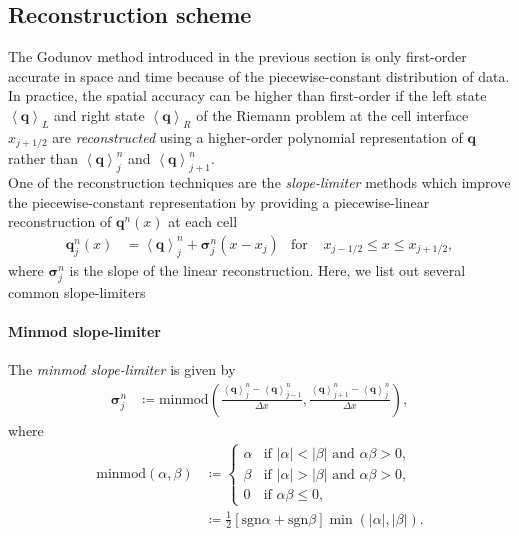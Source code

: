 \subsection{Reconstruction scheme}
The Godunov method introduced in the previous section is only first-order accurate in space and time
because of the piecewise-constant distribution of data.
In practice, the spatial accuracy can be higher than first-order 
if the left state $\left\langle \mathbf{q} \right\rangle_{L}$ 
and right state $\left\langle \mathbf{q} \right\rangle_{R}$ of the Riemann problem
at the cell interface $x_{j+1/2}$
are \textit{reconstructed} using a higher-order polynomial representation of $\mathbf{q}$
rather than $\left\langle \mathbf{q} \right\rangle^n_j$ and $\left\langle \mathbf{q} \right\rangle^n_{j+1}$.\\
One of the reconstruction techniques are the \textit{slope-limiter} methods 
which improve the piecewise-constant representation by providing a piecewise-linear reconstruction
of $\mathbf{q}^n(x)$ at each cell
\begin{align}
    \mathbf{q}^n_j (x) &= \left\langle \mathbf{q} \right\rangle^n_j + \mathbf{\sigma}^n_j \left(x-x_j \right) &
    \text{for } & x_{j-1/2} \leq x \leq x_{j+1/2},
\end{align}
where $\mathbf{\sigma}^n_j$ is the slope of the linear reconstruction.
Here, we list out several common slope-limiters
\paragraph{Minmod slope-limiter}
The \textit{minmod slope-limiter} \cite{ziegler2011semi,kolgan1972application,van1979towards}
is given by
\begin{align}
    \mathbf{\sigma}^n_j &\coloneqq \text{minmod}\left(
    \frac{\left\langle \mathbf{q} \right\rangle^n_j-\left\langle \mathbf{q} \right\rangle^n_{j-1}}{\Delta x},
    \frac{\left\langle \mathbf{q} \right\rangle^n_{j+1}-\left\langle \mathbf{q} \right\rangle^n_{j}}{\Delta x} \right),
\end{align}
where
\begin{align}
    \text{minmod}\left(\alpha, \beta \right) &\coloneqq
    \begin{cases}
        \alpha & \text{if } |\alpha|<|\beta| \text{ and } \alpha\beta>0, \\
        \beta & \text{if } |\alpha|>|\beta| \text{ and } \alpha\beta>0, \\
        0 & \text{if } \alpha\beta \leq 0,
    \end{cases}\\
    &\coloneqq \frac{1}{2}\left[ \text{sgn}{\alpha} + \text{sgn}{\beta} \right] \min \left(|\alpha|,|\beta| \right).
\end{align}

